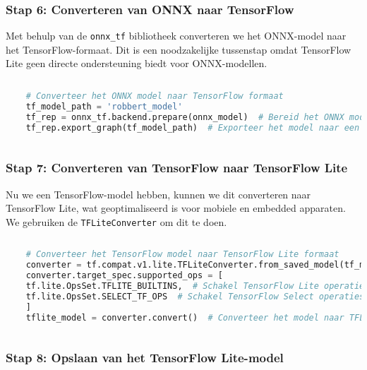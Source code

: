 \subsubsection*{Stap 6: Converteren van ONNX naar TensorFlow}

Met behulp van de \texttt{onnx\_tf} bibliotheek converteren we het ONNX-model naar het TensorFlow-formaat. Dit is een noodzakelijke tussenstap omdat TensorFlow Lite geen directe ondersteuning biedt voor ONNX-modellen.

\begin{lstlisting}[language=Python, caption={Converteren van het ONNX-model naar TensorFlow-formaat.}]
    
    # Converteer het ONNX model naar TensorFlow formaat
    tf_model_path = 'robbert_model'
    tf_rep = onnx_tf.backend.prepare(onnx_model)  # Bereid het ONNX model voor op TensorFlow backend
    tf_rep.export_graph(tf_model_path)  # Exporteer het model naar een TensorFlow grafiek
    
\end{lstlisting}

\subsubsection{Stap 7: Converteren van TensorFlow naar TensorFlow Lite}

Nu we een TensorFlow-model hebben, kunnen we dit converteren naar TensorFlow Lite, wat geoptimaliseerd is voor mobiele en embedded apparaten. We gebruiken de \texttt{TFLiteConverter} om dit te doen.

\begin{lstlisting}[language=Python, caption={Converteren van het TensorFlow-model naar TensorFlow Lite-formaat.}]
    
    # Converteer het TensorFlow model naar TensorFlow Lite formaat
    converter = tf.compat.v1.lite.TFLiteConverter.from_saved_model(tf_model_path)
    converter.target_spec.supported_ops = [
    tf.lite.OpsSet.TFLITE_BUILTINS,  # Schakel TensorFlow Lite operaties in
    tf.lite.OpsSet.SELECT_TF_OPS  # Schakel TensorFlow Select operaties in
    ]
    tflite_model = converter.convert()  # Converteer het model naar TFLite
    
\end{lstlisting}

\subsubsection{Stap 8: Opslaan van het TensorFlow Lite-model}

